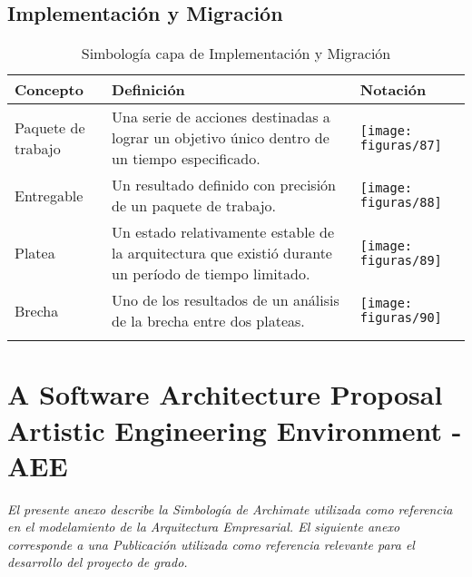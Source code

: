 \section{Implementación y Migración}
  \begin{longtable}
  	{m{3cm}m{4.8cm}m{5.2cm}}
  	\hline
  	\rowcolor[HTML]{0073a1}
  	{\color[HTML]{FFFFFF} \textbf{Concepto}} & {\color[HTML]{FFFFFF} \textbf{Definición}} & {\color[HTML]{FFFFFF} \textbf{Notación}} \\
  	\hline
	Paquete de trabajo & Una serie de acciones destinadas a lograr un objetivo único dentro de un tiempo especificado. & \texttt{[image: figuras/87]} \\ \hline
	Entregable & Un resultado definido con precisión de un paquete de trabajo. & \texttt{[image: figuras/88]} \\ \hline
	Platea & Un estado relativamente estable de la arquitectura que existió durante un período de tiempo limitado. & \texttt{[image: figuras/89]} \\ \hline
	Brecha & Uno de los resultados de un análisis de la brecha entre dos plateas. & \texttt{[image: figuras/90]} \\
	\bottomrule
	\captionsetup{width=.95\textwidth}
	\caption{Simbología\index{Simbología} capa de Implementación\index{Implementación} y Migración\index{Migración} \cite{ref9}}
	\label{tabla36}
  \end{longtable}
  
\chapter{A Software Architecture Proposal Artistic Engineering Environment -AEE}
\label{apex:articulo}
\textit{El presente anexo describe la Simbología de Archimate utilizada como referencia en el modelamiento de la Arquitectura Empresarial. El siguiente anexo corresponde a una Publicación utilizada como referencia relevante para el desarrollo del proyecto de grado.}
\vfill
\cleardoublepage
